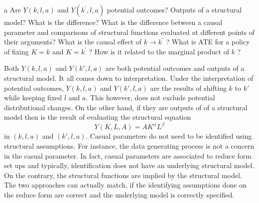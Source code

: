 \documentclass{article}
\begin{document}
\begin{problem}{a}
Are $Y(k, l, a)$ and $Y\left(k^{\prime}, l, a\right)$ potential outcomes? Outputs of a structural model? What is the difference? What is the difference between a causal parameter and comparisons of structural functions evaluated at different points of their arguments? What is the causal effect of $k \rightarrow k^{\prime}$ ? What is ATE for a policy of fixing $K=k$ and $K=k^{\prime}$ ? How is it related to the marginal product of $k$ ?
\end{problem}
\begin{solution}
Both $Y(k,l,a)$ and $Y(k',l,a)$ are both potential outcomes and outputs of a structural model. It all comes down to interpretation. Under the interpretation of potential outcomes, $Y(k,l,a)$ and $Y(k',l,a)$ are the results of shifting $k$ to $k'$ while keeping fixed $l$ and $a$. This however, does not exclude potential distributional changes. On the other hand, if they are outputs of of a structural model then is the result of evaluating the structural equation 
\begin{equation*}
    Y(K,L,A) = AK^\alpha L^\beta
\end{equation*}
in $(k,l,a)$ and $(k',l,a)$. Casual parameters do not need to be identified using structural assumptions. For instance, the data generating process is not a concern in the casual parameter. In fact, casual parameters are associated to reduce form set ups and typically, identification does not have an underlying structural model. On the contrary, the structural functions are implied by the structural model. The two approaches can actually match, if the identifying assumptions done on the reduce form are correct and the underlying model is correctly specified. 


\end{solution}
\end{document}
